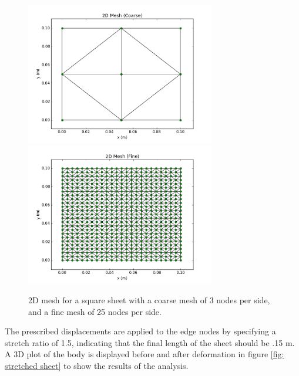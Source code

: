\documentclass[]{spie}  %
\begin{document}
\begin{figure}[h]
	\centering
	\includegraphics[width=3.25in]{mesh_coarse.png} \quad
	\includegraphics[width=3.25in]{mesh_fine.png} 
	\caption{2D mesh for a square sheet with a coarse mesh of 3 nodes per side, and a fine mesh of 25 nodes per side.} 
	\label{fig: 2d mesh}
\end{figure}

The prescribed displacements are applied to the edge nodes by specifying a stretch ratio of 1.5, indicating that the final length of the sheet should be .15 m. A 3D plot of the body is displayed before and after deformation in figure \ref{fig: stretched sheet} to show the results of the analysis. 
\end{document}
